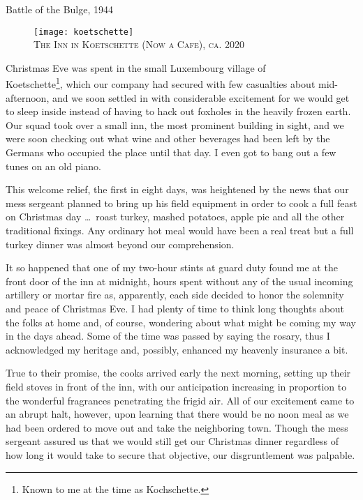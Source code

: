 \documentclass[../m3y]{subfiles}
\begin{document}
\vspace*{-30pt}
\begin{center}\large Battle of the Bulge, 1944\end{center}

\begin{figure}[t]
\centering
\texttt{[image: koetschette]}\\
\medskip
{\newtimes\textsc{The Inn in Koetschette (Now a Cafe), ca. 2020}}
\end{figure}

Christmas Eve was spent in the small Luxembourg village of \\Koetschette\footnote{Known to me at the time as Kochschette.}, which our company had secured with few casualties about mid-afternoon, and we soon settled in with considerable excitement for we would get to sleep inside instead of having to hack out foxholes in the heavily frozen earth. Our squad took over a small inn, the most prominent building in sight, and we were soon checking out what wine and other beverages had been left by the Germans who occupied the place until that day. I even got to bang out a few tunes on an old piano.

This welcome relief, the first in eight days, was heightened by the news that our mess sergeant planned to bring up his field equipment in order to cook a full feast on Christmas day \ldots\ roast turkey, mashed potatoes, apple pie and all the other traditional fixings. Any ordinary hot meal would have been a real treat but a full turkey dinner was almost beyond our comprehension.

It so happened that one of my two-hour stints at guard duty found me at the front door of the inn at midnight, hours spent without any of the usual incoming artillery or mortar fire as, apparently, each side decided to honor the solemnity and peace of Christmas Eve. I had plenty of time to think long thoughts about the folks at home and, of course, wondering about what might be coming my way in the days ahead. Some of the time was passed by saying the rosary, thus I acknowledged my heritage and, possibly, enhanced my heavenly insurance a bit.

True to their promise, the cooks arrived early the next morning, setting up their field stoves in front of the inn, with our anticipation increasing in proportion to the wonderful fragrances penetrating the frigid air. All of our excitement came to an abrupt halt, however, upon learning that there would be no noon meal as we had been ordered to move out and take the neighboring town. Though the mess sergeant assured us that we would still get our Christmas dinner regardless of how long it would take to secure that objective, our disgruntlement was palpable.
\end{document}
